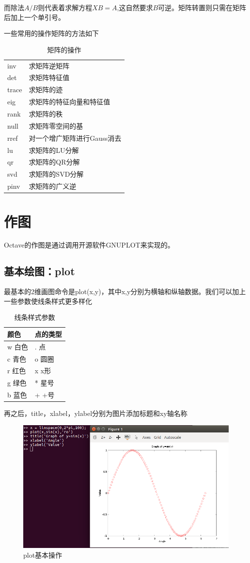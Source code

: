 \documentclass[a4paper,11pt]{ctexart}
\begin{document}
而除法$A/B$则代表着求解方程$XB=A$,这自然要求$B$可逆。矩阵转置则只需在矩阵后加上一个单引号。\par
一些常用的操作矩阵的方法如下
\begin{table}[H]
	\centering
	\begin{tabular}{L{4cm}l}
		\hline
inv &求矩阵逆矩阵\\
det &求矩阵特征值\\
trace &求矩阵的迹\\
eig &求矩阵的特征向量和特征值\\
rank &求矩阵的秩\\
null &求矩阵零空间的基\\
rref &对一个增广矩阵进行Gauss消去\\
lu &求矩阵的LU分解\\
qr &求矩阵的QR分解\\
svd &求矩阵的SVD分解\\
pinv &求矩阵的广义逆\\
		\hline
	\end{tabular}
	\caption{矩阵的操作}
\end{table}
\newpage
\section{作图}
Octave的作图是通过调用开源软件GNUPLOT来实现的。
\subsection{基本绘图：plot}
最基本的2维画图命令是plot(x,y)，其中x,y分别为横轴和纵轴数据。我们可以加上一些参数使线条样式更多样化
\begin{table}[H]
	\centering
	\begin{tabular}{L{4cm}L{2cm}}
		\hline
		颜色 & 点的类型\\
		\hline
		w 白色&. 点\\
		c 青色&o 圆圈\\
		r 红色&x x形\\
		g 绿色&* 星号\\
		b 蓝色&+ +号\\
		\hline
	\end{tabular}
	\caption{线条样式参数}
\end{table}
\noindent 再之后，title，xlabel，ylabel分别为图片添加标题和xy轴名称
\begin{figure}[H]
	\begin{center}
		\includegraphics[width=.8\textwidth]{plotl.png}
	\end{center}
	\caption{plot基本操作}
\end{figure}
\end{document}
